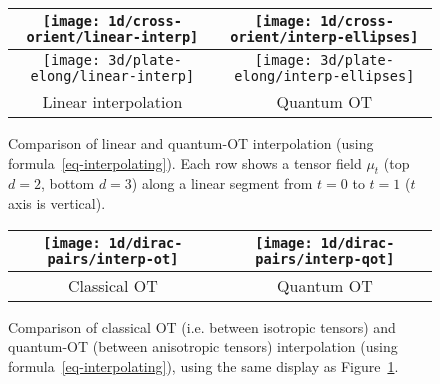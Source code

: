 
\begin{figure}\centering
\begin{tabular}{@{}c@{}|@{}c@{}}
\texttt{[image: 1d/cross-orient/linear-interp]}&
\texttt{[image: 1d/cross-orient/interp-ellipses]}\\\hline
\texttt{[image: 3d/plate-elong/linear-interp]}&
\texttt{[image: 3d/plate-elong/interp-ellipses]}\\\hline
Linear interpolation & Quantum OT
\end{tabular}
\caption{Comparison of linear and quantum-OT interpolation (using formula~\eqref{eq-interpolating}). 
Each row shows a tensor field $\mu_t$ (top $d=2$, bottom $d=3$) along a linear segment from $t=0$ to $t=1$ ($t$ axis is vertical).
} \label{fig:1d-interp}
\end{figure}

\begin{figure}\centering
\begin{tabular}{@{}c@{}|@{}c@{}}
\texttt{[image: 1d/dirac-pairs/interp-ot]}&
\texttt{[image: 1d/dirac-pairs/interp-qot]}\\\hline
Classical OT & Quantum OT
\end{tabular}
\caption{Comparison of classical OT (i.e. between isotropic tensors) and quantum-OT (between anisotropic tensors) interpolation (using formula~\eqref{eq-interpolating}), using the same display as Figure~\ref{fig:1d-interp}. 
} \label{fig:qot-vs-ot}
\end{figure}
